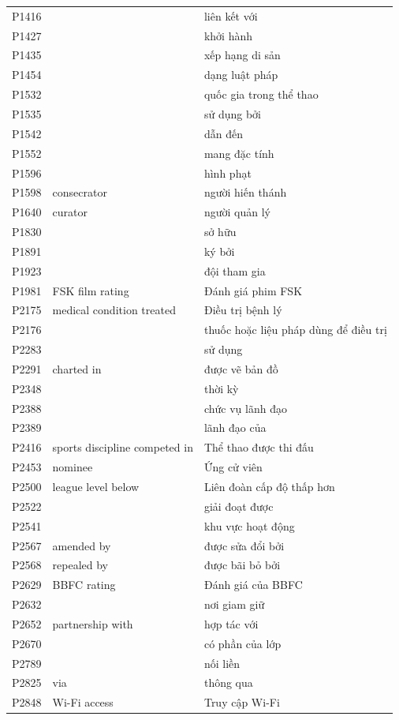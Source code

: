 \begin{center}
\begin{longtable}{p{1.6cm} p{5.2cm} p{5.2cm}}
P1416 &  & liên kết với \\
P1427 &  & khởi hành \\
P1435 &  & xếp hạng di sản \\
P1454 &  & dạng luật pháp \\
P1532 &  & quốc gia trong thể thao \\
P1535 &  & sử dụng bởi \\
P1542 &  & dẫn đến \\
P1552 &  & mang đặc tính \\
P1596 &  & hình phạt \\
P1598 & consecrator & người hiến thánh \\
P1640 & curator & người quản lý \\
P1830 &  & sở hữu \\
P1891 &  & ký bởi \\
P1923 &  & đội tham gia \\
P1981 & FSK film rating & Đánh giá phim FSK \\
P2175 & medical condition treated & Điều trị bệnh lý \\
P2176 &  & thuốc hoặc liệu pháp dùng để điều trị \\
P2283 &  & sử dụng \\
P2291 & charted in & được vẽ bản đồ \\
P2348 &  & thời kỳ \\
P2388 &  & chức vụ lãnh đạo \\
P2389 &  & lãnh đạo của \\
P2416 & sports discipline competed in & Thể thao được thi đấu \\
P2453 & nominee & Ứng cử viên \\
P2500 & league level below & Liên đoàn cấp độ thấp hơn \\
P2522 &  & giải đoạt được \\
P2541 &  & khu vực hoạt động \\
P2567 & amended by & được sửa đổi bởi \\
P2568 & repealed by & được bãi bỏ bởi \\
P2629 & BBFC rating & Đánh giá của BBFC \\
P2632 &  & nơi giam giữ \\
P2652 & partnership with & hợp tác với \\
P2670 &  & có phần của lớp \\
P2789 &  & nối liền \\
P2825 & via & thông qua \\
P2848 & Wi-Fi access & Truy cập Wi-Fi \\

\end{longtable}
\end{center}
